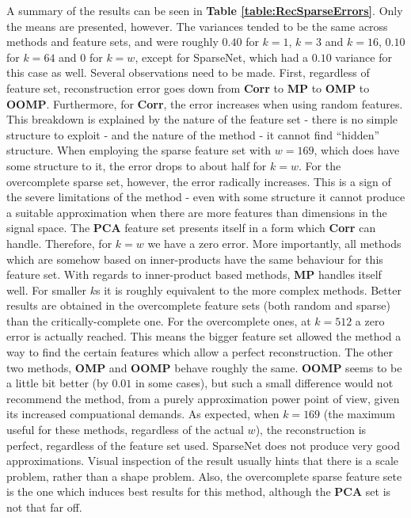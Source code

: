\documentclass[12pt,a4paper,oneside,english]{UPBThesis}
\begin{document}
\clearpage

A summary  of the results can be seen in \textbf{Table \ref{table:RecSparseErrors}}. Only the means are presented, however. The variances tended to be the same across methods and feature sets, and were roughly $0.40$ for $k=1$, $k=3$ and $k=16$, $0.10$ for $k=64$ and $0$ for $k=w$, except for SparseNet, which had a $0.10$ variance for this case as well. Several observations need to be made. First, regardless of feature set, reconstruction error goes down from \textbf{Corr} to \textbf{MP} to \textbf{OMP} to \textbf{OOMP}. Furthermore, for \textbf{Corr}, the error increases when  using random features. This breakdown is explained by the nature of the feature set - there is no simple structure to exploit - and the nature of the method - it cannot find ``hidden'' structure. When employing the sparse feature set with $w=169$, which does have some structure to it, the error drops to about half for $k=w$. For the overcomplete sparse set, however, the error radically increases. This is a sign of the severe limitations of the method - even with some structure it cannot produce a suitable approximation when there are more features than dimensions in the signal space. The \textbf{PCA} feature set presents itself in a form which \textbf{Corr} can handle. Therefore, for $k=w$ we have a zero error. More importantly, all methods which are somehow based on inner-products have the same behaviour for this feature set. With regards to inner-product based methods, \textbf{MP} handles itself well. For smaller $k$s it is roughly equivalent to the more complex methods. Better results are obtained in the overcomplete feature sets (both random and sparse) than the critically-complete one. For the overcomplete ones, at $k=512$ a zero error is actually reached. This means the bigger feature set allowed the method a way to find the certain features which allow a perfect reconstruction. The other two methods, \textbf{OMP} and \textbf{OOMP} behave roughly the same. \textbf{OOMP} seems to be a little bit better (by $0.01$ in some cases), but such a small difference would not recommend the method, from a purely approximation power point of view, given its increased compuational demands. As expected, when $k=169$ (the maximum useful for these methods, regardless of the actual $w$), the reconstruction is perfect, regardless of the feature set used. SparseNet does not produce very good approximations. Visual inspection of the result usually hints that there is a scale problem, rather than a shape problem. Also, the overcomplete sparse feature sete is the one which induces best results for this method, although the \textbf{PCA} set is not that far off.
\end{document}
